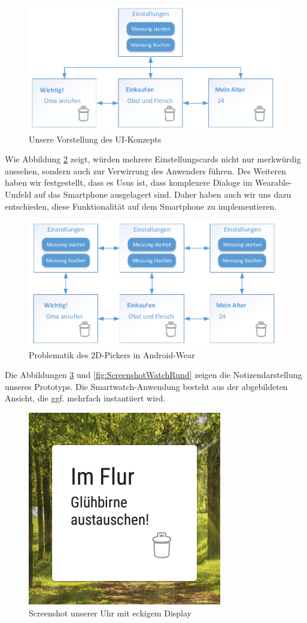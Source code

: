 \begin{figure}[H]
	\centering
	\includegraphics[width=0.85\linewidth]{Bilder/EinstellungenSoll}
	\caption{Unsere Vorstellung des UI-Konzepts}
	\label{fig:EinstellungenSoll}
\end{figure}

Wie Abbildung \ref{fig:EinstellungenIst} zeigt, würden mehrere Einstellungscards nicht nur merkwürdig aussehen, sondern auch zur Verwirrung des Anwenders führen. Des Weiteren haben wir festgestellt, dass es Usus ist, dass komplexere Dialoge im Wearable-Umfeld auf das Smartphone ausgelagert sind. Daher haben auch wir uns dazu entschieden, diese Funktionalität auf dem Smartphone zu implementieren.

\begin{figure}[H]
\centering
\includegraphics[width=0.85\linewidth]{Bilder/EinstellungenIst}
\caption{Problematik des 2D-Pickers in Android-Wear}
\label{fig:EinstellungenIst}
\end{figure}

Die Abbildungen \ref{fig:ScreenshotWatchEckig} und \ref{fig:ScreenshotWatchRund} zeigen
die Notizendarstellung unseres Prototyps. Die Smartwatch-Anwendung besteht aus der abgebildeten Ansicht, die ggf. mehrfach instantiiert wird.

\begin{figure}[H]
\centering
\includegraphics[width=0.3\linewidth]{../Bilder/ScreenshotWatchEckig}
\caption{Screenshot unserer Uhr mit eckigem Display}
\label{fig:ScreenshotWatchEckig}
\end{figure}


